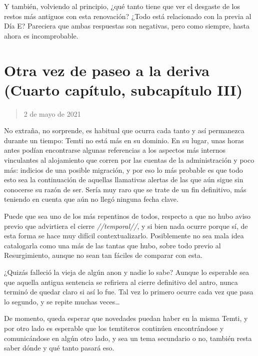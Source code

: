 \documentclass[
  spanish,
]{book}
\begin{document}
Y también, volviendo al principio, ¿qué tanto tiene que ver el desgaste de los restos más antiguos con esta renovación? ¿Todo está relacionado con la previa al Día E? Pareciera que ambas respuestas son negativas, pero como siempre, hasta ahora es incomprobable.

\hypertarget{otra-vez-de-paseo-a-la-deriva-cuarto-capuxedtulo-subcapuxedtulo-iii}{%
\section{Otra vez de paseo a la deriva (Cuarto capítulo, subcapítulo III)}\label{otra-vez-de-paseo-a-la-deriva-cuarto-capuxedtulo-subcapuxedtulo-iii}}

\begin{quote}
2 de mayo de 2021
\end{quote}

No extraña, no sorprende, es habitual que ocurra cada tanto y así permanezca durante un tiempo: Temti no está más en su dominio. En su lugar, unas horas antes podían encontrarse algunas referencias a los aspectos más internos vinculantes al alojamiento que corren por las cuentas de la administración y poco más: indicios de una posible migración, y por eso lo más probable es que todo esto sea la continuación de aquellas llamativas alertas de las que aún sigue sin conocerse su razón de ser. Sería muy raro que se trate de un fin definitivo, más teniendo en cuenta que aún no llegó ninguna fecha clave.

Puede que sea uno de los más repentinos de todos, respecto a que no hubo aviso previo que advirtiera el cierre \emph{//temporal//}, y si bien nada ocurre porque sí, de esta forma se hace muy difícil contextualizarlo. Posiblemente no sea mala idea catalogarla como una más de las tantas que hubo, sobre todo previo al Resurgimiento, aunque no sean tan fáciles de comparar con esta.

¿Quizás falleció la vieja de algún anon y nadie lo sabe? Aunque lo esperable sea que aquella antigua sentencia se refiriera al cierre definitivo del antro, nunca terminó de quedar claro si así lo fue. Tal vez lo primero ocurre cada vez que pasa lo segundo, y se repite muchas veces\ldots{}

De momento, queda esperar que novedades puedan haber en la misma Temti, y por otro lado es esperable que los temtiteros continúen encontrándose y comunicándose en algún otro lado, y sea un tema secundario o no, también resta saber dónde y qué tanto pasará eso.
\end{document}
